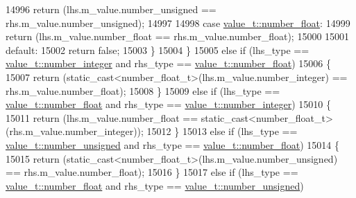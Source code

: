 \begin{DoxyCode}
14996                     \textcolor{keywordflow}{return} (lhs.m\_value.number\_unsigned == rhs.m\_value.number\_unsigned);
14997 
14998                 \textcolor{keywordflow}{case} \hyperlink{namespacenlohmann_1_1detail_a1ed8fc6239da25abcaf681d30ace4985ad9966ecb59667235a57b4b999a649eef}{value\_t::number\_float}:
14999                     \textcolor{keywordflow}{return} (lhs.m\_value.number\_float == rhs.m\_value.number\_float);
15000 
15001                 \textcolor{keywordflow}{default}:
15002                     \textcolor{keywordflow}{return} \textcolor{keyword}{false};
15003             \}
15004         \}
15005         \textcolor{keywordflow}{else} \textcolor{keywordflow}{if} (lhs\_type == \hyperlink{namespacenlohmann_1_1detail_a1ed8fc6239da25abcaf681d30ace4985a5763da164f8659d94a56e29df64b4bcc}{value\_t::number\_integer} and rhs\_type == 
      \hyperlink{namespacenlohmann_1_1detail_a1ed8fc6239da25abcaf681d30ace4985ad9966ecb59667235a57b4b999a649eef}{value\_t::number\_float})
15006         \{
15007             \textcolor{keywordflow}{return} (static\_cast<number\_float\_t>(lhs.m\_value.number\_integer) == rhs.m\_value.number\_float);
15008         \}
15009         \textcolor{keywordflow}{else} \textcolor{keywordflow}{if} (lhs\_type == \hyperlink{namespacenlohmann_1_1detail_a1ed8fc6239da25abcaf681d30ace4985ad9966ecb59667235a57b4b999a649eef}{value\_t::number\_float} and rhs\_type == 
      \hyperlink{namespacenlohmann_1_1detail_a1ed8fc6239da25abcaf681d30ace4985a5763da164f8659d94a56e29df64b4bcc}{value\_t::number\_integer})
15010         \{
15011             \textcolor{keywordflow}{return} (lhs.m\_value.number\_float == static\_cast<number\_float\_t>(rhs.m\_value.number\_integer));
15012         \}
15013         \textcolor{keywordflow}{else} \textcolor{keywordflow}{if} (lhs\_type == \hyperlink{namespacenlohmann_1_1detail_a1ed8fc6239da25abcaf681d30ace4985adce7cc8ec29055c4158828921f2f265e}{value\_t::number\_unsigned} and rhs\_type == 
      \hyperlink{namespacenlohmann_1_1detail_a1ed8fc6239da25abcaf681d30ace4985ad9966ecb59667235a57b4b999a649eef}{value\_t::number\_float})
15014         \{
15015             \textcolor{keywordflow}{return} (static\_cast<number\_float\_t>(lhs.m\_value.number\_unsigned) == rhs.m\_value.number\_float);
15016         \}
15017         \textcolor{keywordflow}{else} \textcolor{keywordflow}{if} (lhs\_type == \hyperlink{namespacenlohmann_1_1detail_a1ed8fc6239da25abcaf681d30ace4985ad9966ecb59667235a57b4b999a649eef}{value\_t::number\_float} and rhs\_type == 
      \hyperlink{namespacenlohmann_1_1detail_a1ed8fc6239da25abcaf681d30ace4985adce7cc8ec29055c4158828921f2f265e}{value\_t::number\_unsigned})

\end{DoxyCode}
